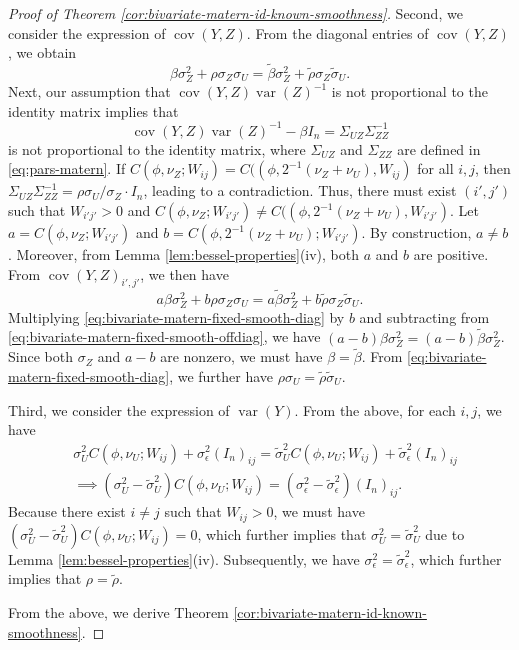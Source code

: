 \documentclass[11pt]{article}
\theoremstyle{definition}
\theoremstyle{remark}
\DeclareMathOperator{\var}{var}
\DeclareMathOperator{\cov}{cov}
\begin{document}
\begin{proof}[Proof of Theorem \ref{cor:bivariate-matern-id-known-smoothness}]
Second, we consider the expression of $\cov(Y,Z)$. 
From the diagonal entries of $\cov(Y,Z)$, we obtain
\begin{equation}\label{eq:bivariate-matern-fixed-smooth-diag}\beta \sigma_Z^2 + \rho \sigma_Z\sigma_U = \tilde\beta \sigma_Z^2 + \tilde\rho\sigma_Z\tilde\sigma_U.\end{equation} 
Next, our assumption that $\cov(Y,Z)\var(Z)^{-1}$ is not proportional to the identity matrix implies that 
\[ \cov(Y,Z)\var(Z)^{-1} - \beta I_n =\Sigma_{UZ}\Sigma_{ZZ}^{-1} \]
is not proportional to the identity matrix, where $\Sigma_{UZ}$ and $\Sigma_{ZZ}$ are defined in \eqref{eq:pars-matern}.
If $C(\phi, \nu_Z; W_{ij}) = C((\phi, 2^{-1}(\nu_Z+\nu_U), W_{ij})$ for all $i,j$, then $\Sigma_{UZ}\Sigma_{ZZ}^{-1} = \rho \sigma_U/\sigma_Z \cdot I_n$, leading to a contradiction. 
Thus, there must exist $(i', j')$ such that $W_{i'j'}>0$ and $C(\phi, \nu_Z; W_{i'j'}) \neq C((\phi, 2^{-1}(\nu_Z+\nu_U), W_{i'j'})$. 
Let $a=C(\phi, \nu_Z; W_{i'j'})$ and $b=C(\phi, 2^{-1}(\nu_Z+\nu_U); W_{i'j'})$. By construction, $a\neq b$. Moreover, from Lemma  \ref{lem:bessel-properties}(iv), both $a$ and $b$ are positive. 
From $\cov(Y,Z)_{i', j'}$, we then have  
\begin{equation}\label{eq:bivariate-matern-fixed-smooth-offdiag}a\beta \sigma_Z^2 + b\rho \sigma_Z\sigma_U = a \tilde\beta \sigma_Z^2 +b \tilde\rho \sigma_Z\tilde\sigma_U. \end{equation}
Multiplying \eqref{eq:bivariate-matern-fixed-smooth-diag} by $b$ and subtracting from \eqref{eq:bivariate-matern-fixed-smooth-offdiag}, we have
$
(a-b)\beta \sigma_Z^2 = (a-b)\tilde\beta \sigma_Z^2
$. Since both $\sigma_Z$ and $a-b$ are nonzero, we must have $\beta = \tilde\beta$. From \eqref{eq:bivariate-matern-fixed-smooth-diag}, we further have $\rho\sigma_U = \tilde\rho\tilde\sigma_U$. 

Third, we consider the expression of $\var(Y)$. From the above, for each $i,j$, we have 
\begin{align*} &\sigma_U^2 C(\phi, \nu_U; W_{ij}) + \sigma_\epsilon^2(I_n)_{ij}  = \tilde\sigma_U^2 C(\phi, \nu_U; W_{ij}) +\tilde\sigma_\epsilon^2(I_n)_{ij}  \\
&\implies (\sigma_U^2 - \tilde\sigma_U^2)C(\phi, \nu_U; W_{ij}) = (\sigma_\epsilon^2 - \tilde\sigma_\epsilon^2)(I_n)_{ij}.\end{align*}
Because there exist $i \ne j$ such that $W_{ij}>0$, we must have $(\sigma_U^2 - \tilde\sigma_U^2)C(\phi, \nu_U; W_{ij}) =0$, which further implies that $\sigma_U^2 = \tilde\sigma_U^2$ due to Lemma  \ref{lem:bessel-properties}(iv). 
Subsequently, we have $\sigma_\epsilon^2 = \tilde\sigma_\epsilon^2$, which further implies that $\rho = \tilde\rho$.

From the above, we derive Theorem \ref{cor:bivariate-matern-id-known-smoothness}. 
\end{proof}
\end{document}
